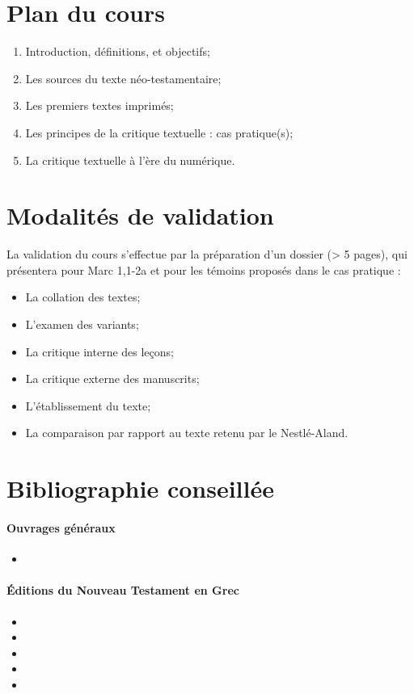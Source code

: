 \documentclass[a4, 12pt]{article}
\begin{document}
\section{Plan du cours}
\begin{enumerate}
    \item Introduction, définitions, et objectifs;
    \item Les sources du texte néo-testamentaire;
    \item Les premiers textes imprimés;
    \item Les principes de la critique textuelle : cas pratique(s);
    \item La critique textuelle à l'ère du numérique.
\end{enumerate}

\section{Modalités de validation}

La validation du cours s'effectue par la préparation d'un dossier (> 5 pages), qui présentera pour Marc 1,1-2a et pour les témoins proposés dans le cas pratique :
\begin{itemize}
    \item La collation des textes;
    \item L'examen des variants;
    \item La critique interne des leçons;
    \item La critique externe des manuscrits;
    \item L'établissement du texte;
    \item La comparaison par rapport au texte retenu par le Nestlé-Aland.
\end{itemize}

\section{Bibliographie conseillée}

\paragraph{Ouvrages généraux}

\begin{itemize}
    \item {}
\end{itemize}

\paragraph{Éditions du Nouveau Testament en Grec}
\begin{itemize}
    \item {}
    \item {}
    \item {}
    \item {}
    \item {}
    \end{itemize}
\end{document}
